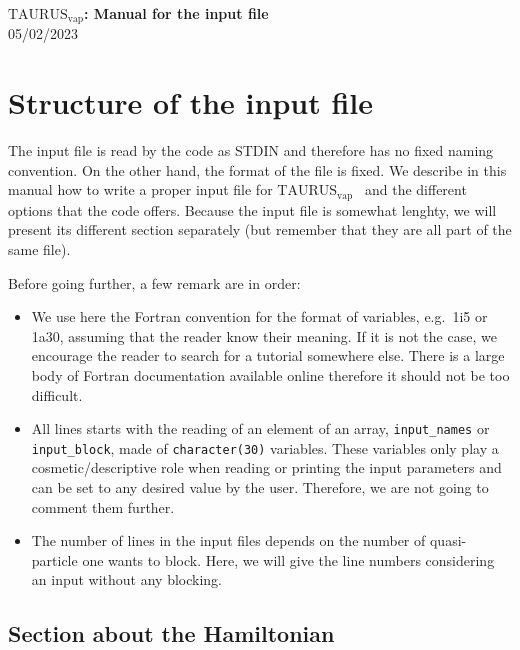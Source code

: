 \documentclass[a4paper,11pt]{article}
\newcommand{\TAURUSvap}{$\text{TAURUS}_{\text{vap}}$}
\newcommand{\ttt}[1]{\texttt{#1}}
\begin{document}
%
% 
\begin{center}
 {\LARGE \textbf{\TAURUSvap: Manual for the input file}} \\[0.20cm]
 {\large 05/02/2023}
\end{center}

%
% 
\section{Structure of the input file}

The input file is read by the code as STDIN and therefore has no fixed naming convention. 
On the other hand, the format of the file is fixed. We describe in this manual how to write a proper input file for \TAURUSvap~
and the different options that the code offers.
Because the input file is somewhat lenghty, we will present its different section separately (but remember that they
are all part of the same file).
 
\noindent Before going further, a few remark are in order:
\begin{itemize}
  \item We use here the Fortran convention for the format of variables, e.g.\ 1i5 or 1a30, assuming that the reader
  know their meaning. If it is not the case, we encourage the reader to search for a tutorial somewhere else.
  There is a large body of Fortran documentation available online therefore it should not be too difficult.

  \item All lines starts with the reading of an element of an array, \ttt{input\_names} or \ttt{input\_block},
  made of \ttt{character(30)} variables. 
  These variables only play a cosmetic/descriptive role when reading or printing the input parameters and can be
  set to any desired value by the user. Therefore, we are not going to comment them further.

  \item The number of lines in the input files depends on the number of quasi-particle one wants to block. Here, we will give
  the line numbers considering an input without any blocking.
\end{itemize}

%
%
\subsection{Section about the Hamiltonian}
\end{document}
